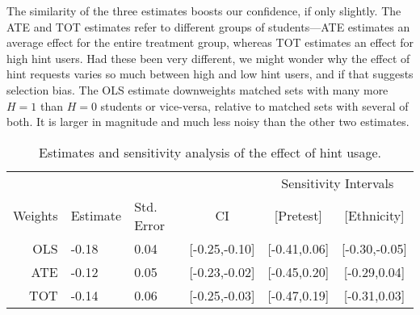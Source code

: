 \documentclass{article}\usepackage[]{graphicx}\usepackage[]{color}
\begin{document}
The similarity of the three estimates boosts our confidence, if only
slightly. The ATE and TOT estimates refer to different groups
of students---ATE estimates an average effect for the entire treatment
group, whereas TOT estimates an effect for high hint users. Had these
been very different, we might wonder why the effect of hint requests
varies so much between high and low hint users, and if that suggests
selection bias.
The OLS estimate downweights matched sets with many more $H=1$ than
$H=0$ students or vice-versa, relative to matched sets with several of
both.
It is larger in magnitude and much less noisy than the other two
estimates.

\begin{table}[ht]
\centering
\begin{tabular}{rllccc}
  \hline
  &&&&\multicolumn{2}{c}{Sensitivity Intervals}\\
 Weights&Estimate&Std. Error&CI&[Pretest]&[Ethnicity] \\
 \hline
OLS & -0.18 & 0.04 & [-0.25,-0.10] & [-0.41,0.06] & [-0.30,-0.05] \\ 
  ATE & -0.12 & 0.05 & [-0.23,-0.02] & [-0.45,0.20] & [-0.29,0.04] \\ 
  TOT & -0.14 & 0.06 & [-0.25,-0.03] & [-0.47,0.19] & [-0.31,0.03] \\ 
   \hline
\end{tabular}
\caption{Estimates and sensitivity analysis of the effect of hint usage.} 
\label{tab:matchResults}
\end{table}


\end{document}
